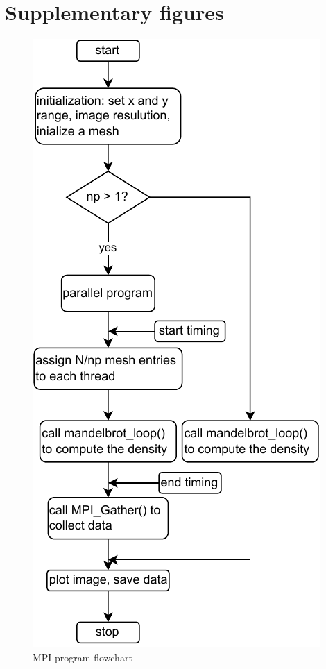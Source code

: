 \documentclass[twoside,12pt]{article}
\theoremstyle{definition}
\theoremstyle{remark}
\begin{document}
\section{Supplementary figures}
\begin{figure}[h!]
    \centering
    \includegraphics[scale=1.35]{../flowchart_mpi.drawio.pdf}
    \caption{MPI program flowchart}
    \label{fig:mpiflow}
\end{figure}
\end{document}
